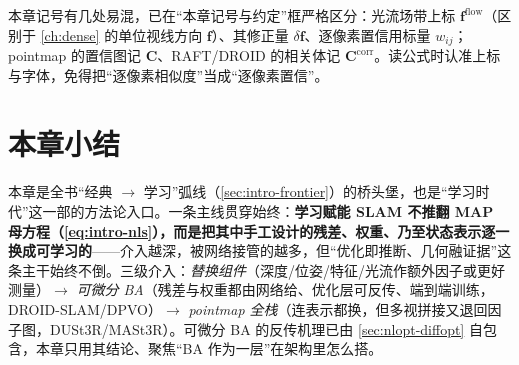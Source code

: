 \begin{pitfall}
本章记号有几处易混，已在“本章记号与约定”框严格区分：光流场带上标 $\mathbf{f}^{\mathrm{flow}}$（区别于 \cref{ch:dense} 的单位视线方向 $\mathbf{f}$）、其修正量 $\delta\mathbf{f}$、逐像素置信用标量 $w_{ij}$；pointmap 的置信图记 $\mathbf{C}$、RAFT/DROID 的相关体记 $\mathbf{C}^{\mathrm{corr}}$。读公式时认准上标与字体，免得把“逐像素相似度”当成“逐像素置信”。
\end{pitfall}

\section*{本章小结}

本章是全书“经典 $\to$ 学习”弧线（\cref{sec:intro-frontier}）的桥头堡，也是“学习时代”这一部的方法论入口。一条主线贯穿始终：\textbf{学习赋能 SLAM 不推翻 MAP 母方程（\cref{eq:intro-nls}），而是把其中手工设计的残差、权重、乃至状态表示逐一换成可学习的}——介入越深，被网络接管的越多，但“优化即推断、几何融证据”这条主干始终不倒。三级介入：\emph{替换组件}（深度/位姿/特征/光流作额外因子或更好测量）$\to$ \emph{可微分 BA}（残差与权重都由网络给、优化层可反传、端到端训练，DROID-SLAM/DPVO）$\to$ \emph{pointmap 全栈}（连表示都换，但多视拼接又退回因子图，DUSt3R/MASt3R）。可微分 BA 的反传机理已由 \cref{sec:nlopt-diffopt} 自包含，本章只用其结论、聚焦“BA 作为一层”在架构里怎么搭。

